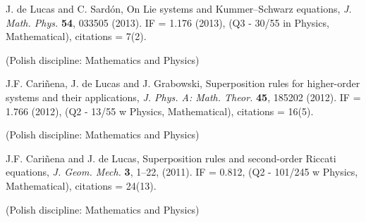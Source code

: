 \documentclass[12pt,reqno]{amsbook}
\begin{document}
\begin{enumerate}
{\item J. de Lucas and C. Sard\'on, \color{blue} On Lie systems and Kummer--Schwarz equations\color{black}, {\it J. Math. Phys.} {\bf 54}, 033505 (2013). IF = 1.176 (2013), (Q3 - 30/55 in Physics, Mathematical), citations = 7(2). } (Polish discipline: Mathematics and Physics)
%



{ \item J.F. Cari\~nena, J. de Lucas and J. Grabowski, \color{blue}Superposition rules for higher-order systems and their applications\color{black}, {\it J. Phys. A: Math. Theor.} {\bf 45}, 185202 (2012).  IF = 1.766 (2012), (Q2 - 13/55 w Physics, Mathematical), citations = 16(5).} (Polish discipline: Mathematics and Physics)


%



{ \item  J.F. Cari\~nena and J. de Lucas, \color{blue}Superposition rules and second-order Riccati equations\color{black}, {\it J. Geom. Mech. }{\bf 3}, 1--22, (2011).  IF = 0.812, (Q2 - 101/245 w Physics, Mathematical), citations = 24(13).} (Polish discipline: Mathematics and Physics)


\end{enumerate}
\end{document}
